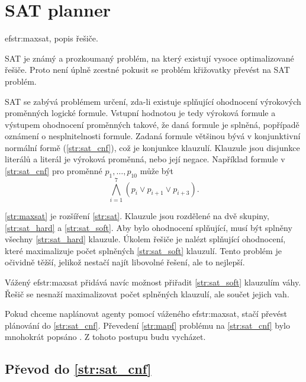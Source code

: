 \section{SAT planner}\label{sec:sat_planner}

ef{str:maxsat}, popis řešiče.
%
%

SAT je známý a prozkoumaný problém, na který existují vysoce optimalizované řešiče.
Proto není úplně zcestné pokusit se problém křižovatky převést na SAT problém.

SAT se zabývá problémem určení,
zda-li existuje splňující ohodnocení výrokových proměnných logické formule.
Vstupní hodnotou je tedy výroková formule a výstupem ohodnocení proměnných takové,
že daná formule je splněná, popřípadě oznámení o nesplnitelnosti formule.
Zadaná formule většinou bývá v konjunktivní normální formě (\ref{str:sat_cnf}), což je konjunkce klauzulí.
Klauzule jsou disjunkce literálů a literál je výroková proměnná, nebo její negace.
Například formule v \ref{str:sat_cnf} pro proměnné $p_1, \dots, p_{10}$ může být
\[
	\bigwedge_{i=1}^{7}(p_i \vee p_{i+1} \vee p_{i + 3}).
\]

\ref{str:maxsat} je rozšíření \ref{str:sat}.
Klauzule jsou rozdělené na dvě skupiny,
\ref{str:sat_hard} a \ref{str:sat_soft}.
Aby bylo ohodnocení splňující, musí být splněny všechny \ref{str:sat_hard} klauzule.
Úkolem řešiče je nalézt splňující ohodnocení, které maximalizuje počet splněných \ref{str:sat_soft} klauzulí.
Tento problém je očividně těžší, jelikož nestačí najít libovolné řešení, ale to nejlepší.

Vážený 
ef{str:maxsat} přidává navíc možnost přiřadit \ref{str:sat_soft} klauzulím váhy.
Řešič se nesnaží maximalizovat počet splněných klauzulí, ale součet jejich vah.

Pokud chceme naplánovat agenty pomocí váženého 
ef{str:maxsat}, stačí převést plánování do \ref{str:sat_cnf}.
Převedení \ref{str:mapf} problému na \ref{str:sat_cnf} bylo mnohokrát popsáno \citep{bartak}.
Z tohoto postupu budu vycházet.

\subsection{Převod do \ref{str:sat_cnf}}\label{subsec:sat_prevod_do_cnf}

